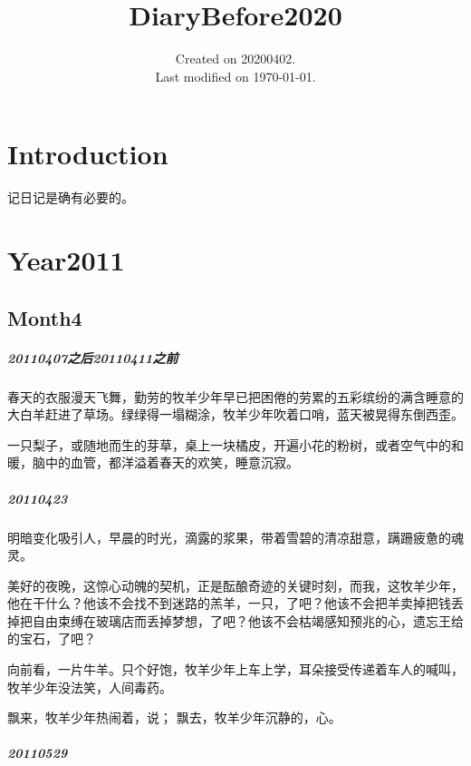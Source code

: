 \documentclass[UTF8]{Diaries}
\begin{document}
\title{DiaryBefore2020}
\date{Created on 20200402.\\   Last modified on \today.}
\maketitle
\tableofcontents




\chapter{Introduction}

记日记是确有必要的。




\chapter{Year2011}

\section{Month4}
\paragraph{20110407之后20110411之前}

春天的衣服漫天飞舞，勤劳的牧羊少年早已把困倦的劳累的五彩缤纷的满含睡意的大白羊赶进了草场。绿绿得一塌糊涂，牧羊少年吹着口哨，蓝天被晃得东倒西歪。

一只梨子，或随地而生的芽草，桌上一块橘皮，开遍小花的粉树，或者空气中的和暖，脑中的血管，都洋溢着春天的欢笑，睡意沉寂。

\paragraph{20110423}
明暗变化吸引人，早晨的时光，滴露的浆果，带着雪碧的清凉甜意，蹒跚疲惫的魂灵。

美好的夜晚，这惊心动魄的契机，正是酝酿奇迹的关键时刻，而我，这牧羊少年，他在干什么？他该不会找不到迷路的羔羊，一只，了吧？他该不会把羊卖掉把钱丢掉把自由束缚在玻璃店而丢掉梦想，了吧？他该不会枯竭感知预兆的心，遗忘王给的宝石，了吧？

向前看，一片牛羊。只个好饱，牧羊少年上车上学，耳朵接受传递着车人的喊叫，牧羊少年没法笑，人间毒药。

飘来，牧羊少年热闹着，说；
飘去，牧羊少年沉静的，心。


\paragraph{20110529}
\end{document}
